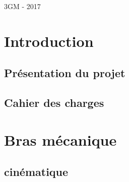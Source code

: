 \documentclass[a4paper, titlepage]{report}
\begin{document}
\begin{titlepage}
{\large 3GM - 2017}\\[3cm] %



\vfill %

\end{titlepage}



	 
	\chapter {Introduction}
		\section {Présentation du projet}
		\section {Cahier des charges}
	\chapter {Bras mécanique}
		\section {cinématique}
\end{document}
